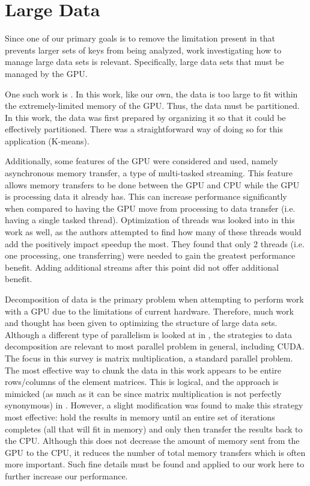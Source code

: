 \documentclass[12pt]{ucthesis}
\begin{document}
\section{Large Data}
\label{sec:largedata}
Since one of our primary goals is to remove the limitation present in
\cite{scharfglass2012breaking} that prevents larger sets of keys from being
analyzed, work investigating how to manage large data sets is relevant.
Specifically, large data sets that must be managed by the GPU.

One such work is \cite{wu2009clustering}. In this work, like our own, the data
is too large to fit within the extremely-limited memory of the GPU. Thus, the
data must be partitioned. In this work, the data was first prepared by
organizing it so that it could be effectively partitioned. There was a
straightforward way of doing so for this application (K-means).

Additionally, some features of the GPU were considered and used, namely
asynchronous memory transfer, a type of multi-tasked streaming. This feature
allows memory transfers to be done between the GPU and CPU while the GPU is
processing data it already has. This can increase performance significantly
when compared to having the GPU move from processing to data transfer (i.e.
having a single tasked thread). Optimization of threads was looked into in this
work as well, as the authors attempted to find how many of these threads would
add the positively impact speedup the most. They found that only 2 threads
(i.e. one processing, one transferring) were needed to gain the greatest
performance benefit. Adding additional streams after this point did not offer
additional benefit.

Decomposition of data is the primary problem when attempting to perform work
with a GPU due to the limitations of current hardware. Therefore, much work and
thought has been given to optimizing the structure of large data sets. Although
a different type of parallelism is looked at in \cite{charles2012chunking}, the
strategies to data decomposition are relevant to most parallel problem in
general, including CUDA. The focus in this survey is matrix multiplication,
a standard parallel problem. The most effective way to chunk the data in this
work appears to be entire rows/columns of the element matrices. This is logical,
and the approach is mimicked (as much as it can be since matrix multiplication
is not perfectly synonymous) in \cite{scharfglass2012breaking}. However, a slight
modification was found to make this strategy most effective: hold the results
in memory until an entire set of iterations completes (all that will fit in
memory) and only then transfer the results back to the CPU. Although this does
not decrease the amount of memory sent from the GPU to the CPU, it reduces the
number of total memory transfers which is often more important. Such fine
details must be found and applied to our work here to further increase our
performance.
\end{document}
